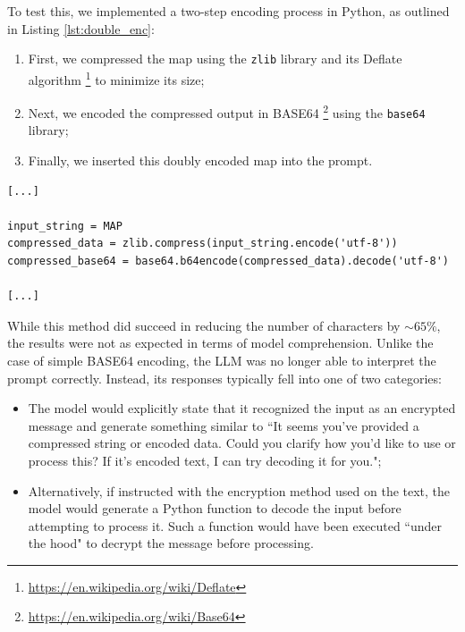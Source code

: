 To test this, we implemented a two-step encoding process in Python, as outlined in
Listing \ref{lst:double_enc}:
\begin{enumerate}
  \item First, we compressed the map using the \texttt{zlib} library and its Deflate
    algorithm \footnote{\url{https://en.wikipedia.org/wiki/Deflate}} to minimize
    its size;

  \item Next, we encoded the compressed output in BASE64 \footnote{\url{https://en.wikipedia.org/wiki/Base64}}
    using the \texttt{base64} library;

  \item Finally, we inserted this doubly encoded map into the prompt.
\end{enumerate}

\vspace{5mm}
\begin{codewindow}
    \begin{lstlisting}
[...]

input_string = MAP
compressed_data = zlib.compress(input_string.encode('utf-8'))
compressed_base64 = base64.b64encode(compressed_data).decode('utf-8')

[...]
\end{lstlisting}
\end{codewindow}
\vspace{5mm}

While this method did succeed in reducing the number of characters by
$\sim 65\%$, the results were not as expected in terms of model comprehension.
Unlike the case of simple BASE64 encoding, the LLM was no longer able to interpret
the prompt correctly. Instead, its responses typically fell into one of two categories:
\begin{itemize}
  \item The model would explicitly state that it recognized the input as an encrypted
    message and generate something similar to ``It seems you've provided a compressed
    string or encoded data. Could you clarify how you'd like to use or process
    this? If it's encoded text, I can try decoding it for you.";

  \item Alternatively, if instructed with the encryption method used on the text,
    the model would generate a Python function to decode the input before attempting
    to process it. Such a function would have been executed ``under the hood" to
    decrypt the message before processing.
\end{itemize}

